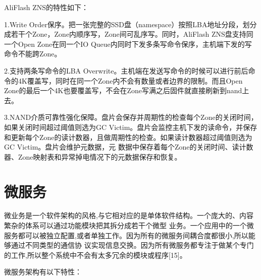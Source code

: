 AliFlash ZNS的特性如下：

1.Write Order保序。把一张完整的SSD盘（namespace）按照LBA地址分段，划分成若干个Zone，Zone内顺序写，Zone间可乱序写。同时，AliFlash ZNS盘支持同一个Open Zone在同一个IO Queue内同时下发多条写命令保序，主机端下发的写命令不能跨Zone。

2.支持两条写命令的LBA Overwrite。主机端在发送写命令的时候可以进行前后命令的4K覆盖写，同时在同一个Zone内不会有数量或者边界的限制。而且Open Zone的最后一个4K也要覆盖写，不会在Zone写满之后固件就直接刷新到nand上去。

3.NAND介质可靠性强化保障。盘片会保存并周期性的检查每个Zone的关闭时间，如果关闭时间超过阈值则选为GC Victim。盘片会监控主机下发的读命令，并保存和更新每个Zone的读计数器，且做周期性的检查。如果读计数器超过阈值则选为GC Victim。盘片会维护元数据，元
数据中保存着每个Zone的关闭时间、读计数器、Zone映射表和异常掉电情况下的元数据保存和恢复。



\section{微服务}



微业务是一个软件架构的风格,与它相对应的是单体软件结构。一个庞大的、内容繁杂的体系可以通过功能模块把其拆分成若干个微型
业务。一个应用中的一个微服务都可以被独立配置,或者单独工作。因为所有的微服务间耦合度都很小,所以能够通过不同类型的通信协
议实现信息交换。因为所有微服务都专注于做某个专门的工作,所以整个系统中不会有太多冗余的模块或程序[15]。

微服务架构有以下特性：




